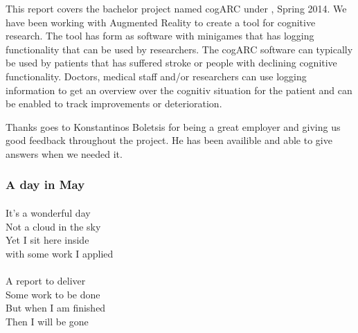 This report covers the bachelor project named cogARC under \GUC{}, Spring 2014. We have been working with \gls{Augmented
Reality} to create a tool for cognitive research. The tool has form as software 
with minigames that has logging functionality that can be used by researchers. 
The cogARC software can typically be used by patients that has suffered stroke
or people with declining cognitive functionality. Doctors, medical staff and/or
researchers can use logging information to get an overview over the cognitiv
situation for the patient and can be enabled to track improvements or
deterioration.


Thanks goes to Konstantinos Boletsis for being a great employer and giving us good feedback
throughout the project. He has been availible and able to give answers when we
needed it.


\vfill{}

\begin{center}
	
	\subsubsection{A day in May}
	\paragraph{}

	It's a wonderful day\\
	Not a cloud in the sky\\
	Yet I sit here inside\\
	with some work I applied\\

	\paragraph{}

	A report to deliver\\
	Some work to be done\\
	But when I am finished\\
	Then I will be gone\\

\end{center}

\vfill{}